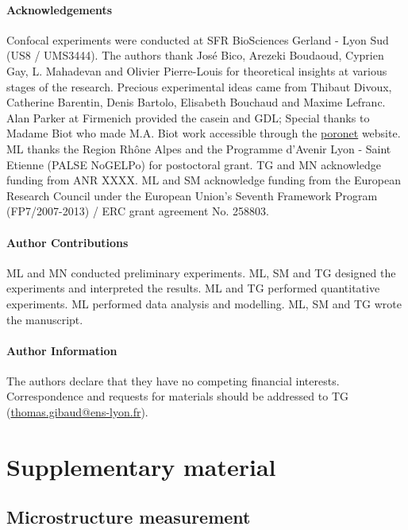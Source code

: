 \documentclass[twocolumn,superscriptaddress,showpacs,preprintnumbers,
amsmath,amssymb,prl]{revtex4-1}
\begin{document}
\paragraph*{Acknowledgements}
Confocal experiments were conducted at SFR BioSciences Gerland - Lyon Sud (US8 / UMS3444).
The authors thank José Bico, Arezeki Boudaoud, Cyprien Gay, L. Mahadevan and Olivier Pierre-Louis for theoretical insights at various stages of the research. 
Precious experimental ideas came from Thibaut Divoux, Catherine Barentin, Denis Bartolo, Elisabeth Bouchaud and Maxime Lefranc.
Alan Parker at Firmenich provided the casein and GDL; 
Special thanks to Madame Biot who made M.A. Biot work accessible through the \href{http://www.olemiss.edu/sciencenet/poronet/}{poronet} website. 
ML thanks the Region Rhône Alpes and the Programme d'Avenir Lyon - Saint Etienne (PALSE NoGELPo) for postoctoral grant. 
TG and MN acknowledge funding from ANR XXXX. 
ML and SM acknowledge funding from the European Research Council under the European Union's Seventh Framework Program (FP7/2007-2013) / ERC grant agreement No. 258803.


\paragraph*{Author Contributions}
ML and MN conducted preliminary experiments. ML, SM and TG designed the experiments and interpreted the results. ML and TG performed quantitative experiments. ML performed data analysis and modelling. ML, SM and TG wrote the manuscript.


\paragraph*{Author Information} 
The authors declare that they have no competing financial interests. 
Correspondence and requests for materials should be addressed to TG (\href{mailto:thomas.gibaud@ens-lyon.fr}{thomas.gibaud@ens-lyon.fr}).






\clearpage
\newpage
\setcounter{figure}{0}

\section*{Supplementary material}

\subsection*{Microstructure measurement}
\end{document}
